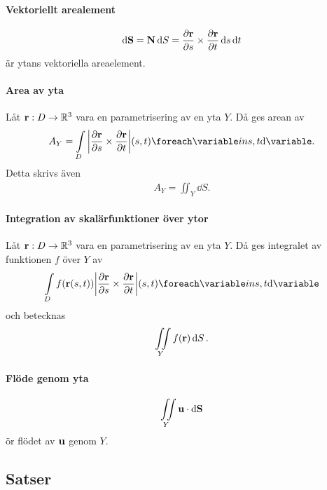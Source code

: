 \paragraph{Vektoriellt arealement}
\begin{align*}
	\dd{\vect{S}} = \vect{N}\dd{S} = \pdv{\vect{r}}{s}\times\pdv{\vect{r}}{t}\dd{s}\dd{t}
\end{align*}
är ytans vektoriella areaelement.

\paragraph{Area av yta}
Låt $\vect{r}: D\to\R^3$ vara en parametrisering av en yta $Y$. Då ges arean av
\begin{align*}
	A_Y = \inteval{D}{\abs{\pdv{\vect{r}}{s}\times\pdv{\vect{r}}{t}}}{{s, t}}. 
\end{align*}
Detta skrivs även
\begin{align*}
	A_Y = \iint_{Y}\dd{S}.
\end{align*}

\paragraph{Integration av skalärfunktioner över ytor}
Låt $\vect{r}: D\to\R^3$ vara en parametrisering av en yta $Y$. Då ges integralet av funktionen $f$ över $Y$ av
\begin{align*}
	\inteval{D}{f(\vect{r}(s, t))\abs{\pdv{\vect{r}}{s}\times\pdv{\vect{r}}{t}}}{{s, t}}
\end{align*}
och betecknas
\begin{align*}
	\iint\limits_{Y}f(\vect{r})\dd{S}.
\end{align*}

\paragraph{Flöde genom yta}
\begin{align*}
	\fint{Y}{\vect{u}}{\vect{S}}
\end{align*}
ör flödet av $\vect{u}$ genom $Y$.

\subsection{Satser}